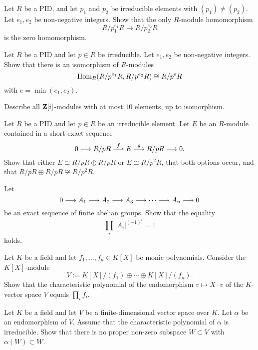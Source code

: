 \begin{exercise}
Let $R$ be a PID, and let $p_1$ and $p_2$ be irreducible elements with $(p_1) \neq (p_2)$. Let $e_1,e_2$ be non-negative integers. Show that the only $R$-module homomorphism
\[
	R/p_1^{e_1}R \to R/p_2^{e_2}R
\]
is the zero homomorphism. 
\end{exercise}

\begin{exercise}
Let $R$ be a PID and let $p\in R$ be irreducible. Let $e_1,e_2$ be non-negative integers. Show that there is an isomorphism of
 $R$-modules
\[
	\operatorname{Hom}_R(R/p^{e_1}R,R/p^{e_2}R) \cong R/p^e R
\]
with $e=\min(e_1,e_2)$.
\end{exercise}

\begin{exercise}
Describe all ${\mathbf{Z}}[i]$-modules with at most $10$ elements, up to isomorphism.
\end{exercise}

\begin{exercise}
Let $R$ be a PID and let $p \in R$ be an irreducible element. Let $E$ be an $R$-module contained in a short exact sequence
\[
	0 \longrightarrow R/pR \overset{f}{\longrightarrow} E \overset{g}{\longrightarrow} R/pR \longrightarrow 0.
\]
Show that either $E \cong R/pR \oplus R/pR$ or $E\cong R/p^2R$, that both options occur, and that 
$R/pR \oplus R/pR \not\cong R/p^2R$.
\end{exercise}

\begin{exercise}[$\star$]
Let
\[
	0 \longrightarrow A_1 \longrightarrow A_2 \longrightarrow A_3 \longrightarrow \cdots \longrightarrow A_n \longrightarrow 0
\]
be an exact sequence of finite abelian groups. Show that the equality
\[
	\prod_i |A_i|^{(-1)^{i}} = 1
\]
holds.
\end{exercise}

\begin{exercise}
Let $K$ be a field and let $f_1,\ldots, f_n \in K[X]$ be monic polynomials. Consider the $K[X]$-module
\[
	V := K[X]/(f_1) \oplus \cdots \oplus K[X]/(f_n).
\]
Show that the characteristic polynomial of the endomorphism $v\mapsto X\cdot v$ of the $K$-vector space $V$ equals $\prod_i f_i$.
\end{exercise}

\begin{exercise}
Let $K$ be a field and let $V$ be a finite-dimensional vector space over $K$. Let $\alpha$ be an endomorphism of $V$. 
Assume that the characteristic polynomial of $\alpha$ is irreducible. Show that there is no proper non-zero subspace $W\subset V$ with $\alpha(W) \subset W$.
\end{exercise}

